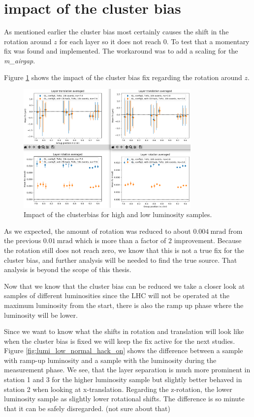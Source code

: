 \section{impact of the cluster bias}
\label{sec:clusterbias}

As mentioned earlier the cluster bias most certainly causes the shift in the rotation around $z$ for each layer so it does not reach 0.
To test that a momentary fix was found and implemented. The workaround was to add a scaling for the \textit{m\_airgap}\cite{gap}.

Figure \ref{fig:cbhack_on_off} shows the impact of the cluster bias fix regarding the rotation around $z$.

\begin{figure}
  \centering
  \includegraphics[width=0.8\textwidth]{plots/jan_24_2022/compare_with_without_hack.png}
  \caption{Impact of the clusterbias for high and low luminosity samples.}
  \label{fig:cbhack_on_off}
\end{figure}

As we expected, the amount of rotation was reduced to about
$\SI{0.004}{\milli\radian}$ from the previous $\SI{0.01}{\milli\radian}$ which is more than a factor of 2 improvement. Because the rotation still does not reach zero, we know that this is not a true fix for the cluster bias, and further analysis will be needed to find the true source. That analysis is beyond the scope of this thesis.

Now that we know that the cluster bias can be reduced we take a closer look at samples of different luminosities since the LHC will not be operated at the maximum luminosity from the start, there is also the ramp up phase where the luminosity will be lower.

Since we want to know what the shifts in rotation and translation will look like when the cluster bias is fixed we will keep the fix active for the next studies.
Figure \ref{fig:lumi_low_normal_hack_on} shows the difference between a sample with ramp-up luminosity and a sample with the luminosity during the measurement phase.
We see, that the layer separation is much more prominent in station 1 and 3 for the higher luminosity sample but slightly better behaved in station 2 when looking at x-translation.
Regarding the z-rotation, the lower luminosity sample as slightly lower rotational shifts.
The difference is so minute that it can be safely disregarded. (not sure about that)

